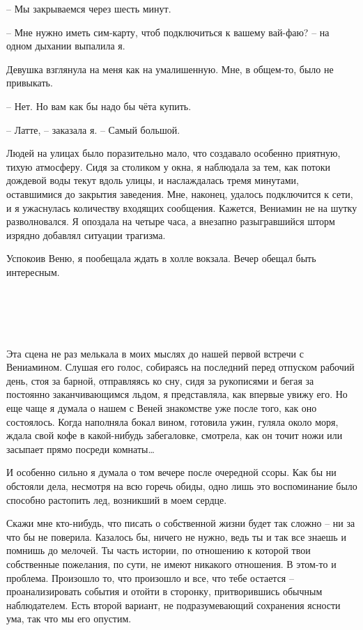 \documentclass[
]{book}
\begin{document}
-- Мы закрываемся через шесть минут.

-- Мне нужно иметь сим-карту, чтоб подключиться к вашему вай-фаю? -- на одном дыхании выпалила я.

Девушка взглянула на меня как на умалишенную. Мне, в общем-то, было не привыкать.

-- Нет. Но вам как бы надо бы чёта купить.

-- Латте, -- заказала я. -- Самый большой.

Людей на улицах было поразительно мало, что создавало особенно приятную, тихую атмосферу. Сидя за столиком у окна, я наблюдала за тем, как потоки дождевой воды текут вдоль улицы, и наслаждалась тремя минутами, оставшимися до закрытия заведения. Мне, наконец, удалось подключится к сети, и я ужаснулась количеству входящих сообщения. Кажется, Вениамин не на шутку разволновался. Я опоздала на четыре часа, а внезапно разыгравшийся шторм изрядно добавлял ситуации трагизма.

Успокоив Веню, я пообещала ждать в холле вокзала. Вечер обещал быть интересным.

\hypertarget{chapter-8}{%
\chapter{~}\label{chapter-8}}

Эта сцена не раз мелькала в моих мыслях до нашей первой встречи с Вениамином. Слушая его голос, собираясь на последний перед отпуском рабочий день, стоя за барной, отправляясь ко сну, сидя за рукописями и бегая за постоянно заканчивающимся льдом, я представляла, как впервые увижу его. Но еще чаще я думала о нашем с Веней знакомстве уже после того, как оно состоялось. Когда наполняла бокал вином, готовила ужин, гуляла около моря, ждала свой кофе в какой-нибудь забегаловке, смотрела, как он точит ножи или засыпает прямо посреди комнаты\ldots{}

И особенно сильно я думала о том вечере после очередной ссоры. Как бы ни обстояли дела, несмотря на всю горечь обиды, одно лишь это воспоминание было способно растопить лед, возникший в моем сердце.

Скажи мне кто-нибудь, что писать о собственной жизни будет так сложно -- ни за что бы не поверила. Казалось бы, ничего не нужно, ведь ты и так все знаешь и помнишь до мелочей. Ты часть истории, по отношению к которой твои собственные пожелания, по сути, не имеют никакого отношения. В этом-то и проблема. Произошло то, что произошло и все, что тебе остается -- проанализировать события и отойти в сторонку, притворившись обычным наблюдателем. Есть второй вариант, не подразумевающий сохранения ясности ума, так что мы его опустим.
\end{document}
